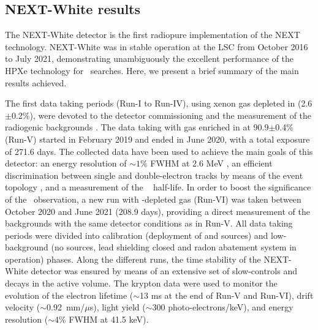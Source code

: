 \subsection{NEXT-White results}
\label{sec.new}


The NEXT-White detector is the first radiopure implementation of the NEXT technology. NEXT-White \cite{NEXT:2018rgj} was in stable operation at the LSC from October 2016 to July 2021, demonstrating unambiguously the excellent performance of the HPXe technology for \bbonu\ searches. Here, we present a brief summary of the main results achieved. 

\indent

The first data taking periods (Run-I to Run-IV), using xenon gas depleted in  (2.6$\pm$0.2\%), were devoted to the detector commissioning and the measurement of the radiogenic backgrounds \cite{NEXT:2018zho,Novella:2019cne}. The data taking with gas enriched in  at 90.9$\pm$0.4\% (Run-V) started in February 2019 and ended in June 2020, with a total exposure of 271.6 days. The collected data have been used to achieve the main goals of this detector: an energy resolution of $\sim1\%$ FWHM at 2.6 MeV \cite{Renner:2019pfe}, an efficient discrimination between single and double-electron tracks by means of the event topology \cite{Ferrario:2019kwg,NEXT:2020jmz,NEXT:2021pjq}, and a measurement of the  \bbtnu~ half-life. In order to boost the significance of the \bbtnu ~observation, a new run with -depleted gas (Run-VI) was taken between October 2020 and June 2021 (208.9 days), providing a direct measurement of the backgrounds with the same detector conditions as in Run-V. All data taking periods were divided into calibration (deployment of  and  sources) and low-background (no sources, lead shielding closed and radon abatement system in operation) phases. Along the different runs, the time stability of the NEXT-White detector was ensured by means of an extensive set of slow-controls and  decays in the active volume. The krypton data were used to monitor the evolution of the electron lifetime ($\sim$13 ms at the end of Run-V and Run-VI), drift velocity ($\sim$0.92~mm/$\mu$s), light yield ($\sim$300 photo-electrons/keV), and energy resolution ($\sim$4\% FWHM at 41.5 keV).      

\indent

